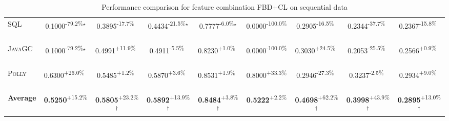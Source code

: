 \begin{table}[htbp]
\begin{tabular}{l|cccc|cccc}
\textsc{SQL} & \cellcolor{red!30}0.1000\textsuperscript{-79.2\%}$^\star$ & \cellcolor{red!30}0.3895\textsuperscript{-17.7\%}$^{\,\,\,}$ & \cellcolor{red!30}0.4434\textsuperscript{-21.5\%}$^\star$ & \cellcolor{red!30}0.7777\textsuperscript{-6.0\%}$^\star$ & \cellcolor{red!30}0.0000\textsuperscript{-100.0\%}$^{\,\,\,}$ & \cellcolor{red!30}0.2905\textsuperscript{-16.5\%}$^{\,\,\,}$ & \cellcolor{red!30}0.2344\textsuperscript{-37.7\%}$^{\,\,\,}$ & \cellcolor{red!30}0.2367\textsuperscript{-15.8\%}$^{\,\,\,}$ \\
\textsc{JavaGC} & \cellcolor{red!30}0.1000\textsuperscript{-79.2\%}$^\star$ & \cellcolor{green!30}0.4991\textsuperscript{+11.9\%}$^{\,\,\,}$ & \cellcolor{red!30}0.4911\textsuperscript{-5.5\%}$^{\,\,\,}$ & \cellcolor{green!30}0.8230\textsuperscript{+1.0\%}$^{\,\,\,}$ & \cellcolor{red!30}0.0000\textsuperscript{-100.0\%}$^{\,\,\,}$ & \cellcolor{green!30}0.3030\textsuperscript{+24.5\%}$^{\,\,\,}$ & \cellcolor{red!30}0.2053\textsuperscript{-25.5\%}$^{\,\,\,}$ & \cellcolor{green!30}0.2566\textsuperscript{+0.9\%}$^{\,\,\,}$ \\
\textsc{Polly} & \cellcolor{green!30}0.6300\textsuperscript{+26.0\%}$^{\,\,\,}$ & \cellcolor{green!30}0.5485\textsuperscript{+1.2\%}$^{\,\,\,}$ & \cellcolor{green!30}0.5870\textsuperscript{+3.6\%}$^{\,\,\,}$ & \cellcolor{green!30}0.8531\textsuperscript{+1.9\%}$^{\,\,\,}$ & \cellcolor{green!30}0.8000\textsuperscript{+33.3\%}$^{\,\,\,}$ & \cellcolor{red!30}0.2946\textsuperscript{-27.3\%}$^{\,\,\,}$ & \cellcolor{red!30}0.3237\textsuperscript{-2.5\%}$^{\,\,\,}$ & \cellcolor{green!30}0.2934\textsuperscript{+9.0\%}$^{\,\,\,}$ \\
\hline
\textbf{Average} & \cellcolor{green!30}\textbf{0.5250}\textsuperscript{+15.2\%}$^{\,\,\,}$ & \cellcolor{green!30}\textbf{0.5805}\textsuperscript{+23.2\%}$^\dagger$ & \cellcolor{green!30}\textbf{0.5892}\textsuperscript{+13.9\%}$^\dagger$ & \cellcolor{green!30}\textbf{0.8484}\textsuperscript{+3.8\%}$^\dagger$ & \cellcolor{green!30}\textbf{0.5222}\textsuperscript{+2.2\%}$^{\,\,\,}$ & \cellcolor{green!30}\textbf{0.4698}\textsuperscript{+62.2\%}$^\dagger$ & \cellcolor{green!30}\textbf{0.3998}\textsuperscript{+43.9\%}$^\dagger$ & \cellcolor{green!30}\textbf{0.2895}\textsuperscript{+13.0\%}$^\dagger$ \\
\hline
\end{tabular}
\caption{Performance comparison for feature combination FBD+CL on sequential data}
\label{tab:combo_FBD_CL_performance_sequential}
\end{table}